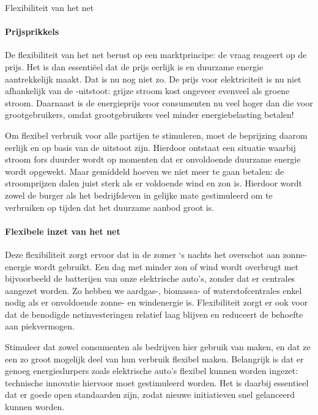 \begin{voorstel}{Flexibiliteit van het net}
\begin{multicols*}{2}
\begin{overwegingen}
\paragraph{Prijsprikkels}
De flexibiliteit van het net berust op een marktprincipe: de vraag reageert op de prijs. Het is dan essentiëel dat de prijs eerlijk is en duurzame energie aantrekkelijk maakt. Dat is nu nog niet zo. De prijs voor elektriciteit is nu niet afhankelijk van de \COO-uitstoot: grijze stroom kost ongeveer evenveel als groene stroom. Daarnaast is de energieprijs voor consumenten nu veel hoger dan die voor grootgebruikers, omdat grootgebruikers veel minder energiebelasting betalen!

Om flexibel verbruik voor alle partijen te stimuleren, moet de beprijzing daarom eerlijk en op basis van de uitstoot zijn. Hierdoor ontstaat een situatie waarbij stroom fors duurder wordt op momenten dat er onvoldoende duurzame energie wordt opgewekt. Maar gemiddeld hoeven we niet meer te gaan betalen: de stroomprijzen dalen juist sterk als er voldoende wind en zon is. Hierdoor wordt zowel de burger als het bedrijfsleven in gelijke mate gestimuleerd om te verbruiken op tijden dat het duurzame aanbod groot is.

\paragraph{Flexibele inzet van het net}
Deze flexibiliteit zorgt ervoor dat in de zomer ‘s nachts het overschot aan zonne-energie wordt gebruikt. Een dag met minder zon of wind wordt overbrugt met bijvoorbeeld de batterijen van onze elektrische auto’s, zonder dat er centrales aangezet worden. Zo hebben we aardgas-, biomassa- of waterstofcentrales enkel nodig als er onvoldoende zonne- en windenergie is. Flexibiliteit zorgt er ook voor dat de benodigde netinvesteringen relatief laag blijven en reduceert de behoefte aan piekvermogen.

\end{overwegingen}

\begin{aanbevelingen}
Stimuleer dat zowel consumenten als bedrijven hier gebruik van maken, en dat ze een zo groot mogelijk deel van hun verbruik flexibel maken. Belangrijk is dat er genoeg energieslurpers zoals elektrische auto's flexibel kunnen worden ingezet: technische innovatie hiervoor moet gestimuleerd worden. Het is daarbij essentieel dat er goede open standaarden zijn, zodat nieuwe initiatieven snel gelanceerd kunnen worden.


\end{aanbevelingen}
\end{multicols*}
\end{voorstel}
